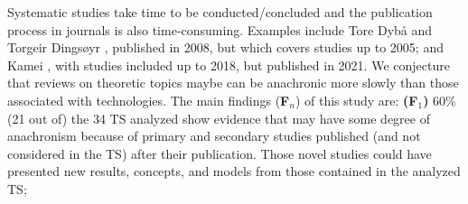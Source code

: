 \documentclass[sigconf]{acmart}
\begin{document}
Systematic studies take time to be conducted/concluded and the publication process in journals is also time-consuming. Examples include Tore Dybå and Torgeir Dingsøyr \cite{DYBA2008}, published in 2008, but which covers studies up to 2005; and Kamei \cite{Kamei2021b}, with studies included up to 2018, but published in 2021. We conjecture that reviews on theoretic topics maybe can be anachronic more slowly than those associated with technologies. The main findings (\textbf{F$_n$}) of this study are: \textbf{(F$_1$)} 60\% (21 out of) the 34 TS analyzed show evidence that may have some degree of anachronism because of primary and secondary studies published (and not considered in the TS) after their publication. Those novel studies could have presented new results, concepts, and models from those contained in the analyzed TS; %
\end{document}
